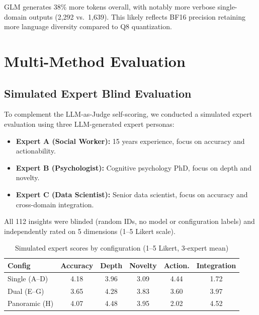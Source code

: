 \documentclass[11pt,a4paper]{article}
\begin{document}
GLM generates 38\% more tokens overall, with notably more verbose
single-domain outputs (2,292 vs.\ 1,639). This likely reflects BF16
precision retaining more language diversity compared to Q8 quantization.


\section{Multi-Method Evaluation}
\label{sec:evaluation}

\subsection{Simulated Expert Blind Evaluation}

To complement the LLM-as-Judge self-scoring, we conducted a simulated expert
evaluation using three LLM-generated expert personas:

\begin{itemize}[leftmargin=*,itemsep=2pt]
  \item \textbf{Expert A (Social Worker):} 15 years experience, focus on
    accuracy and actionability.
  \item \textbf{Expert B (Psychologist):} Cognitive psychology PhD, focus on
    depth and novelty.
  \item \textbf{Expert C (Data Scientist):} Senior data scientist, focus on
    accuracy and cross-domain integration.
\end{itemize}

All 112 insights were blinded (random IDs, no model or configuration labels)
and independently rated on 5 dimensions (1--5 Likert scale).

\begin{table}[H]
\centering
\caption{Simulated expert scores by configuration (1--5 Likert, 3-expert mean)}
\label{tab:expert}
\begin{tabular}{lccccc}
\toprule
\textbf{Config} & \textbf{Accuracy} & \textbf{Depth} & \textbf{Novelty} & \textbf{Action.} & \textbf{Integration} \\
\midrule
Single (A--D) & 4.18 & 3.96 & 3.09 & 4.44 & 1.72 \\
Dual (E--G) & 3.65 & 4.28 & 3.83 & 3.60 & 3.97 \\
Panoramic (H) & 4.07 & 4.48 & 3.95 & 2.02 & 4.52 \\
\bottomrule
\end{tabular}
\end{table}
\end{document}
